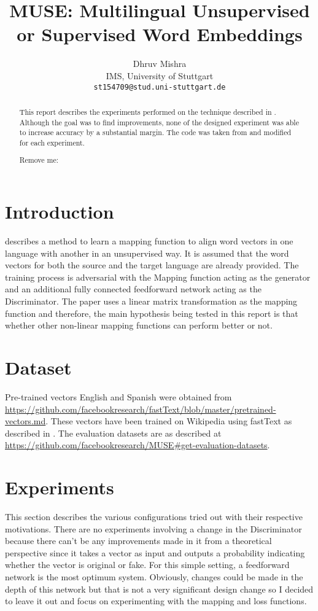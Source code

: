 \documentclass[11pt]{article}
\title{MUSE: Multilingual Unsupervised or Supervised Word Embeddings}
\author{Dhruv Mishra \\
IMS, University of Stuttgart \\
  {\tt st154709@stud.uni-stuttgart.de}}
\date{}
\begin{document}
\maketitle
\begin{abstract}
This report describes the experiments performed on the technique described in \cite{conneau2017word}. Although the goal was to find improvements, none of the designed experiment was able to increase accuracy by a substantial margin. The code was taken from \cite{muserepo} and modified for each experiment.

Remove me: \cite{lample2017unsupervised}

\end{abstract}

\section{Introduction}
\cite{conneau2017word} describes a method to learn a mapping function to align word vectors in one language with another in an unsupervised way. It is assumed that the word vectors for both the source and the target language are already provided. The training process is adversarial with the Mapping function acting as the generator and an additional fully connected feedforward network acting as the Discriminator. The paper uses a linear matrix transformation as the mapping function and therefore, the main hypothesis being tested in this report is that whether other non-linear mapping functions can perform better or not.

\section{Dataset}
Pre-trained vectors English and Spanish were obtained from \url{https://github.com/facebookresearch/fastText/blob/master/pretrained-vectors.md}. These vectors have been trained on Wikipedia using fastText as described in \cite{bojanowski2016enriching}. The evaluation datasets are as described at \url{https://github.com/facebookresearch/MUSE#get-evaluation-datasets}.

\section{Experiments}
This section describes the various configurations tried out with their respective motivations. There are no experiments involving a change in the Discriminator because there can't be any improvements made in it from a theoretical perspective since it takes a vector as input and outputs a probability indicating whether the vector is original or fake. For this simple setting, a feedforward network is the most optimum system. Obviously, changes could be made in the depth of this network but that is not a very significant design change so I decided to leave it out and focus on experimenting with the mapping and loss functions.
\end{document}
